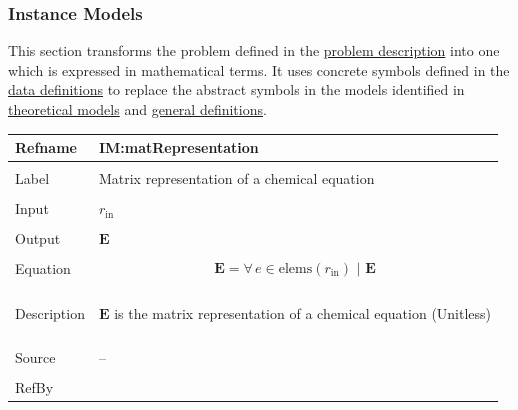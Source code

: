 \documentclass[12pt]{article}
\begin{document}
\subsubsection{Instance Models}
\label{Sec:IMs}
This section transforms the problem defined in the \hyperref[Sec:ProbDesc]{problem description} into one which is expressed in mathematical terms. It uses concrete symbols defined in the \hyperref[Sec:DDs]{data definitions} to replace the abstract symbols in the models identified in \hyperref[Sec:TMs]{theoretical models} and \hyperref[Sec:GDs]{general definitions}.

\vspace{\baselineskip}
\noindent
\begin{minipage}{\textwidth}
\begin{tabular}{>{\raggedright}p{}>{\raggedright\arraybackslash}p{}}
\toprule \textbf{Refname} & \textbf{IM:matRepresentation}
\label{IM:matRepresentation}
\\ \midrule \\
Label & Matrix representation of a chemical equation
        
\\ \midrule \\
Input & ${r_{\text{in}}}$
        
\\ \midrule \\
Output & $\symbf{E}$
         
\\ \midrule \\
Equation & \begin{displaymath}
           \symbf{E}=\forall{}\,{e\in{}\text{elems}\left({r_{\text{in}}}\right)}\text{ | }\symbf{E}
           \end{displaymath}
\\ \midrule \\
Description & \begin{symbDescription}
              \item{$\symbf{E}$ is the matrix representation of a chemical equation (Unitless)}
              \end{symbDescription}
\\ \midrule \\
Source & --
         
\\ \midrule \\
RefBy & 
\\ \bottomrule
\end{tabular}
\end{minipage}
\end{document}
